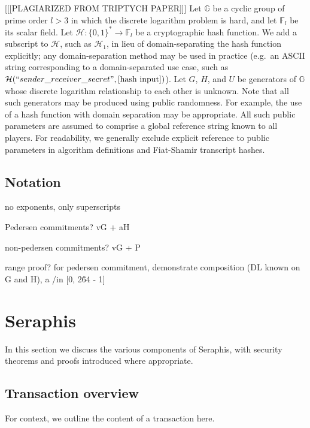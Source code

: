 [[[PLAGIARIZED FROM TRIPTYCH PAPER]]] Let $\mathbb{G}$ be a cyclic group of prime order $l > 3$ in which the discrete logarithm problem is hard, and let $\mathbb{F}_l$ be its scalar field. Let $\mathcal{H}: \{0,1\}^* \to \mathbb{F}_l$ be a cryptographic hash function. We add a subscript to $\mathcal{H}$, such as $\mathcal{H}_1$, in lieu of domain-separating the hash function explicitly; any domain-separation method may be used in practice (e.g.\ an ASCII string corresponding to a domain-separated use case, such as $\mathcal{H}(``sender\_receiver\_secret",[\textrm{hash input}])$). Let $G$, $H$, and $U$ be generators of $\mathbb{G}$ whose discrete logarithm relationship to each other is unknown. Note that all such generators may be produced using public randomness. For example, the use of a hash function with domain separation may be appropriate. All such public parameters are assumed to comprise a global reference string known to all players. For readability, we generally exclude explicit reference to public parameters in algorithm definitions and Fiat-Shamir transcript hashes.


\subsection{Notation}
\label{subsec:preliminaries-notation}

no exponents, only superscripts

Pedersen commitments? vG + aH

non-pedersen commitments? vG + P

range proof? for pedersen commitment, demonstrate composition (DL known on G and H), a /in [0, 2\^64 - 1]



\section{Seraphis}
\label{sec:seraphis}

In this section we discuss the various components of Seraphis, with security theorems and proofs introduced where appropriate.


\subsection{Transaction overview}
\label{subsec:seraphis-transaction-overview}

For context, we outline the content of a transaction here.

